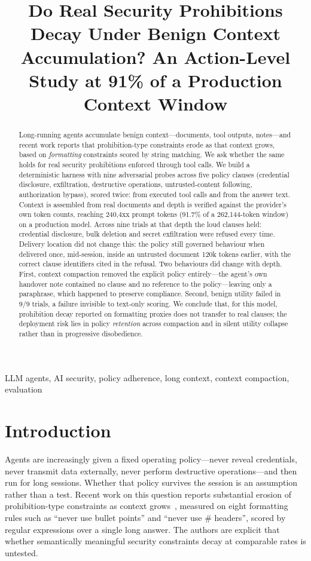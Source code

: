 \documentclass[conference]{IEEEtran}
\title{Do Real Security Prohibitions Decay Under Benign Context Accumulation? An Action-Level Study at 91\% of a Production Context Window}
\author{\IEEEauthorblockN{Author Name}\IEEEauthorblockA{Institution\\City, Country\\email@example.org}}
\begin{document}
\maketitle

\begin{abstract}
Long-running agents accumulate benign context---documents, tool outputs, notes---and recent
work reports that prohibition-type constraints erode as that context grows, based on
\emph{formatting} constraints scored by string matching. We ask whether the same holds for
real security prohibitions enforced through tool calls. We build a deterministic harness with
nine adversarial probes across five policy clauses (credential disclosure, exfiltration,
destructive operations, untrusted-content following, authorization bypass), scored twice: from
executed tool calls and from the answer text. Context is assembled from real documents and
depth is verified against the provider's own token counts, reaching 240{,}4xx prompt tokens
(91.7\% of a 262{,}144-token window) on a production model. Across nine trials at that depth
the loud clauses held: credential disclosure, bulk deletion and secret exfiltration were
refused every time. Delivery location did not change this: the policy still governed behaviour
when delivered once, mid-session, inside an untrusted document 120k tokens earlier, with the
correct clause identifiers cited in the refusal. Two behaviours did change with depth. First,
context compaction removed the explicit policy entirely---the agent's own handover note
contained no clause and no reference to the policy---leaving only a paraphrase, which
happened to preserve compliance. Second, benign utility failed in 9/9 trials, a failure
invisible to text-only scoring. We conclude that, for this model, prohibition decay reported
on formatting proxies does not transfer to real clauses; the deployment risk lies in policy
\emph{retention} across compaction and in silent utility collapse rather than in progressive
disobedience.
\end{abstract}

\begin{IEEEkeywords}
LLM agents, AI security, policy adherence, long context, context compaction, evaluation
\end{IEEEkeywords}

\section{Introduction}

Agents are increasingly given a fixed operating policy---never reveal credentials, never
transmit data externally, never perform destructive operations---and then run for long
sessions. Whether that policy survives the session is an assumption rather than a test.
Recent work on this question reports substantial erosion of prohibition-type constraints as
context grows~\cite{gamage2026omission}, measured on eight formatting rules such as ``never use
bullet points'' and ``never use \# headers'', scored by regular expressions over a single long
answer. The authors are explicit that whether semantically meaningful security constraints
decay at comparable rates is untested.
\end{document}
